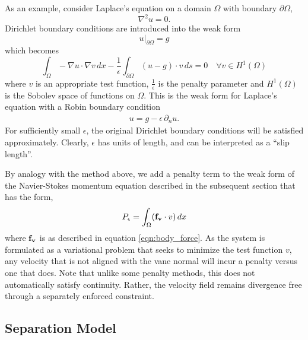 As an example, consider Laplace's 
equation on a domain $\Omega$ with boundary $\partial\Omega$, 
\begin{equation}
 \nabla^2 u = 0. 
\end{equation}
Dirichlet boundary conditions are introduced into the weak form
\begin{equation}
 u|_{\partial \Omega} = g
\end{equation}
which becomes 
\begin{equation}
\int_{\Omega}  - \nabla u \cdot \nabla v \, dx - \frac{1}{\epsilon}
 \int_{\partial \Omega} (u-g) \cdot v \, ds = 0 \quad \forall v \in H^1(\Omega)
\end{equation}
where $v$ is an appropriate test function, $\frac{1}{\epsilon}$ is the
penalty parameter and $H^1(\Omega)$ is the Sobolev space of functions on
$\Omega$. This is the weak form for Laplace's equation with a Robin boundary condition 
\begin{align}
 u = g - \epsilon \, \partial_n u. 
\end{align}
For sufficiently small $\epsilon$, the original Dirichlet boundary
conditions will be satisfied approximately. Clearly, $\epsilon$ has
units of length, and can be interpreted as a ``slip length''. 

%
%
%
%
%

By analogy with the method above, we add a penalty term to the weak
form of the Navier-Stokes momentum equation described in the subsequent
section %
that has the form, 
\begin{equation}
P_\epsilon = \int_\Omega ({\bf f_v} \cdot v) \, dx
\end{equation}
where ${\bf f_v}$ is as described in equation \ref{eqn:body_force}. 
As the system is formulated as a variational problem that seeks to
minimize the test function $v$, any velocity that is not aligned with
the vane normal will incur a penalty versus one that does. Note that unlike
some penalty methods, this does not automatically satisfy
continuity. Rather, the velocity field remains divergence free through a
separately enforced constraint.  

\subsection{Separation Model}

